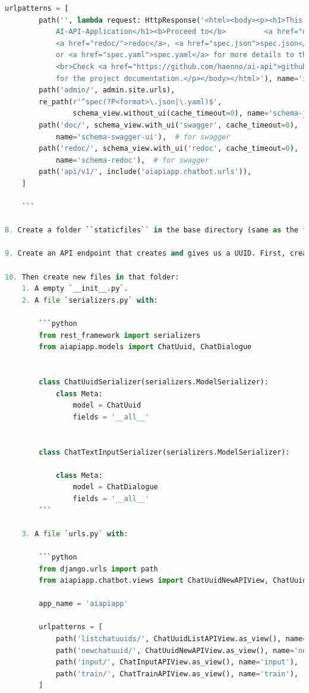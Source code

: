 \documentclass[12pt,oneside,titlepage,listof=totoc,bibliography=totoc]{scrartcl}
\begin{document}
\begin{appendices}
\begin{lstlisting}[language=python,numbers=none]
    urlpatterns = [
        path('', lambda request: HttpResponse('<html><body><p><h1>This is the backend of an \
            AI-API-Application</h1><b>Proceed to</b>         <a href="doc/">doc</a>, \
            <a href="redoc/">redoc</a>, <a href="spec.json">spec.json</a>         \
            or <a href="spec.yaml">spec.yaml</a> for more details to this API.<br>\
            <br>Check <a href="https://github.com/haenno/ai-api">github.com/haenno/ai-api</a>\
            for the project documentation.</p></body></html>'), name='index'),  # for index page
        path('admin/', admin.site.urls),
        re_path(r'^spec(?P<format>\.json|\.yaml)$',
                schema_view.without_ui(cache_timeout=0), name='schema-json'),  # for swagger
        path('doc/', schema_view.with_ui('swagger', cache_timeout=0),
            name='schema-swagger-ui'),  # for swagger
        path('redoc/', schema_view.with_ui('redoc', cache_timeout=0),
            name='schema-redoc'),  # for swagger
        path('api/v1/', include('aiapiapp.chatbot.urls')),
    ]

    ```

8. Create a folder ``staticfiles`` in the base directory (same as the file manage.py).

9. Create an API endpoint that creates and gives us a UUID. First, create a new folder in the APP directory `aiapiapp\chatbot\`.

10. Then create new files in that folder:
    1. A empty `__init__.py`.
    2. A file `serializers.py` with:

        ```python
        from rest_framework import serializers
        from aiapiapp.models import ChatUuid, ChatDialogue


        class ChatUuidSerializer(serializers.ModelSerializer):
            class Meta:
                model = ChatUuid
                fields = '__all__'


        class ChatTextInputSerializer(serializers.ModelSerializer):

            class Meta:
                model = ChatDialogue
                fields = '__all__'
        ```

    3. A file `urls.py` with:

        ```python
        from django.urls import path
        from aiapiapp.chatbot.views import ChatUuidNewAPIView, ChatUuidListAPIView, ChatInputAPIView, ChatTrainAPIView

        app_name = 'aiapiapp'

        urlpatterns = [
            path('listchatuuids/', ChatUuidListAPIView.as_view(), name='listchatuuids'),
            path('newchatuuid/', ChatUuidNewAPIView.as_view(), name='newchatuuid'),
            path('input/', ChatInputAPIView.as_view(), name='input'),
            path('train/', ChatTrainAPIView.as_view(), name='train'),
        ]


\end{lstlisting}
\end{appendices}
\end{document}
